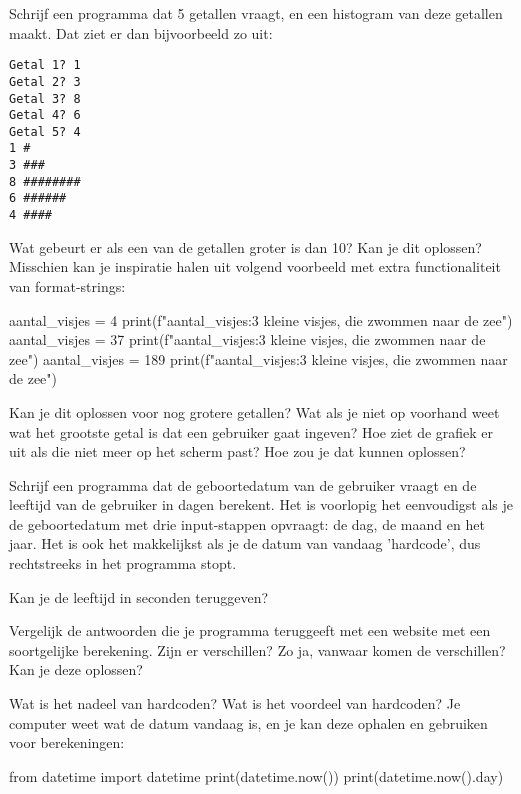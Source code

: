 \documentclass[10pt,a4paper]{article}
\newenvironment{task}{\smallpencil}{}
\newenvironment{hard-task}{\begin{task} {\large \Lightning}}{\end{task}}
\begin{document}
\begin{task}
Schrijf een programma dat 5 getallen vraagt, en een histogram van deze getallen maakt. Dat ziet er dan bijvoorbeeld zo uit:
\begin{verbatim}
Getal 1? 1
Getal 2? 3
Getal 3? 8
Getal 4? 6
Getal 5? 4
1 #
3 ###
8 ########
6 ######
4 ####
\end{verbatim}
\end{task}

\begin{task}
Wat gebeurt er als een van de getallen groter is dan 10? Kan je dit oplossen? Misschien kan je inspiratie halen uit volgend voorbeeld met extra functionaliteit van format-strings:
\begin{python}
aantal_visjes = 4
print(f"{aantal_visjes:3} kleine visjes, die zwommen naar de zee")
aantal_visjes = 37
print(f"{aantal_visjes:3} kleine visjes, die zwommen naar de zee")
aantal_visjes = 189
print(f"{aantal_visjes:3} kleine visjes, die zwommen naar de zee")
\end{python}
\end{task}

\begin{hard-task}
Kan je dit oplossen voor nog grotere getallen? Wat als je niet op voorhand weet wat het grootste getal is dat een gebruiker gaat ingeven? Hoe ziet de grafiek er uit als die niet meer op het scherm past? Hoe zou je dat kunnen oplossen?
\end{hard-task}

\begin{task}
Schrijf een programma dat de geboortedatum van de gebruiker vraagt en de leeftijd van de gebruiker in dagen berekent. Het is voorlopig het eenvoudigst als je de geboortedatum met drie input-stappen opvraagt: de dag, de maand en het jaar. Het is ook het makkelijkst als je de datum van vandaag 'hardcode', dus rechtstreeks in het programma stopt.
\end{task}

\begin{task}
Kan je de leeftijd in seconden teruggeven?
\end{task}

\begin{hard-task}
Vergelijk de antwoorden die je programma teruggeeft met een website met een soortgelijke berekening. Zijn er verschillen? Zo ja, vanwaar komen de verschillen? Kan je deze oplossen?
\end{hard-task}

\begin{hard-task}
Wat is het nadeel van hardcoden? Wat is het voordeel van hardcoden? Je computer weet wat de datum vandaag is, en je kan deze ophalen en gebruiken voor berekeningen:
\begin{python}
from datetime import datetime
print(datetime.now())
print(datetime.now().day)
\end{python}
\end{hard-task}
\end{document}
